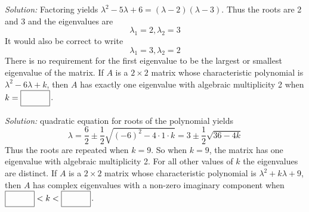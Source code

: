 \begin{parts}
        \ifnum {} {\color{DarkBlue} \textit{Solution:} Factoring yields $\lambda ^2 - 5\lambda + 6 = (\lambda - 2)(\lambda - 3)$. Thus the roots are 2 and 3 and the eigenvalues are $$\lambda_1 = 2, \lambda_2 = 3$$ It would also be correct to write $$\lambda_1 = 3, \lambda_2 = 2$$ There is no requirement for the first eigenvalue to be the largest or smallest eigenvalue of the matrix.  } \fi    
    \fi 
    \ifnum {}
        If $A$ is a $2\times 2$ matrix whose characteristic polynomial is $\lambda ^2 - 6\lambda + k$, then $A$ has exactly one eigenvalue with algebraic multiplicity 2 when $k = \framebox{\strut\hspace{1cm}}$. 
        
        \ifnum {} {\color{DarkBlue} \textit{Solution:} quadratic equation for roots of the polynomial yields $$\lambda = \frac{6}{2} \pm \frac12 \sqrt{(-6)^2 - 4\cdot 1 \cdot k} = 3 \pm \frac12 \sqrt{36 - 4 k}$$ Thus the roots are repeated when $k=9$. So when $k=9$, the matrix has one eigenvalue with algebraic multiplicity 2. For all other values of $k$ the eigenvalues are distinct.  } \fi    
    \fi 
    \ifnum {}
        If $A$ is a $2\times 2$ matrix whose characteristic polynomial is $\lambda ^2 + k\lambda + 9$, then $A$ has complex eigenvalues with a non-zero imaginary component when $\framebox{\strut\hspace{1cm}} < k < \framebox{\strut\hspace{1cm}}$. 
        

\end{parts}
